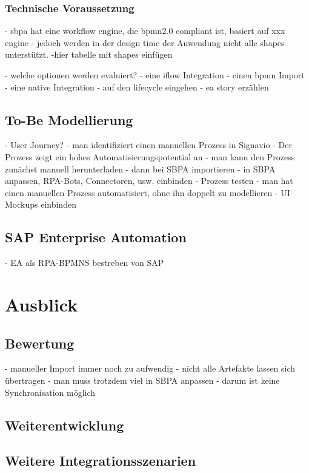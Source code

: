 \subsection{Technische Voraussetzung}
- sbpa hat eine workflow engine, die bpmn2.0 compliant ist, basiert auf xxx engine
- jedoch werden in der design time der Anwendung nicht alle shapes unterstützt.
-hier tabelle mit shapes einfügen

   - welche optionen werden evaluiert?
    - eine iflow Integration
    - einen bpmn Import
    - eine native Integration
    - auf den lifecycle eingehen
    - ea story erzählen
    
    \section{To-Be Modellierung}
    - User Journey?
    - man identifiziert einen manuellen Prozess in Signavio
    - Der Prozess zeigt ein hohes Automatisierungspotential an
    - man kann den Prozess zunächst manuell herunterladen
    - dann bei SBPA importieren
    - in SBPA anpassen, RPA-Bots, Connectoren, usw. einbinden
    - Prozess testen
    - man hat einen manuellen Prozess automatisiert, ohne ihn doppelt zu modellieren
    - UI Mockups einbinden
    \section[short]{SAP Enterprise Automation}
    - EA als RPA-BPMNS bestreben von SAP
\chapter{Ausblick}
    \section{Bewertung}
    - manueller Import immer noch zu aufwendig
    - nicht alle Artefakte lassen sich übertragen
        - man muss trotzdem viel in SBPA anpassen
        - darum ist keine Synchronisation möglich
    \section{Weiterentwicklung}
    \section{Weitere Integrationsszenarien}